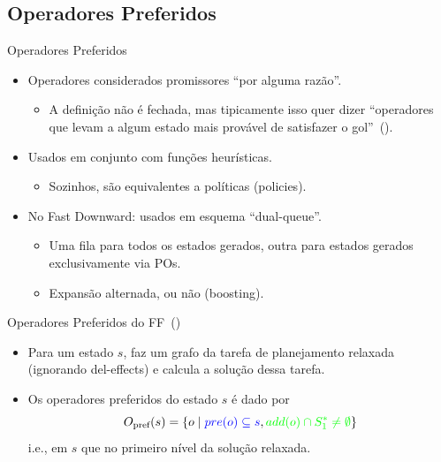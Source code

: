 \documentclass{beamer}
\begin{document}
\subsection{Operadores Preferidos}
\begin{frame}{Operadores Preferidos}
\begin{itemize}
\item \alert{Operadores} considerados \alert{promissores} ``por alguma razão''.
    \pause
  \begin{itemize}
  \item A definição não é fechada, mas tipicamente isso quer dizer ``operadores que levam a algum estado mais provável de satisfazer o gol''~(\cite{Helmert/2006,Richter.Helmert/2009}).
  \end{itemize}
  \pause
\item Usados em conjunto com funções heurísticas.
  \begin{itemize}
  \item Sozinhos, são equivalentes a políticas (policies).
  \end{itemize}
\pause
\item No Fast Downward: usados em esquema ``\alert{dual-queue}''.
  \begin{itemize}
  \item Uma fila para todos os estados gerados, outra para \alert{estados gerados exclusivamente via POs}.
  \item Expansão alternada, ou não (\alert{boosting}).
  \end{itemize}
\end{itemize}
\end{frame}

\begin{frame}{Operadores Preferidos do FF~(\cite{Hoffmann.Nebel/2001})}
\begin{itemize}
\item Para um estado $s$, faz um grafo da tarefa de planejamento \alert{relaxada} (ignorando del-effects) e calcula a solução dessa tarefa.
\pause
\item Os operadores preferidos do estado $s$ é dado por $$O_{\text{pref}}(s) = \{o \mid {\color{blue} pre(o) \subseteq s}, {\color{green} add(o) \cap S_{1}^{*} \neq \emptyset} \}$$
i.e.,  em $s$ que  no primeiro nível da solução relaxada.
\end{itemize}
\end{frame}
\end{document}
